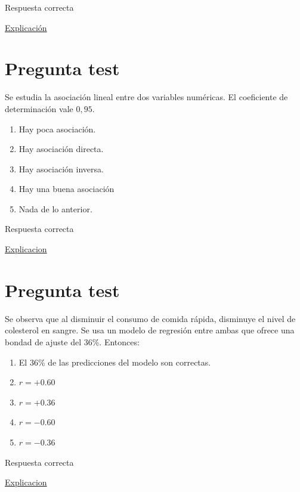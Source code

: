 \documentclass[
]{book}
\providecommand{\tightlist}{%
  \setlength{\itemsep}{0pt}\setlength{\parskip}{0pt}}
\begin{document}
Respuesta correcta

\href{https://1fjmanzano.github.io/bioestadistica/relaci\%C3\%B3n-entre-variables-nume\%CC\%81ricas.html\#coeficiente-de-correlacio\%CC\%81n}{Explicación}

\hypertarget{pregunta-test-119}{%
\section{Pregunta test}\label{pregunta-test-119}}

Se estudia la asociación lineal entre dos variables numéricas. El coeficiente de determinación vale \(0,95\).

\begin{enumerate}
\def\labelenumi{\alph{enumi})}
\tightlist
\item
  Hay poca asociación.
\item
  Hay asociación directa.
\item
  Hay asociación inversa.
\item
  Hay una buena asociación
\item
  Nada de lo anterior.
\end{enumerate}

Respuesta correcta

\href{https://es.wikipedia.org/wiki/Coeficiente_de_determinación}{Explicacion}

\hypertarget{pregunta-test-120}{%
\section{Pregunta test}\label{pregunta-test-120}}

Se observa que al disminuir el consumo de comida rápida, disminuye el nivel de colesterol en sangre. Se usa un modelo de regresión entre ambas que ofrece una bondad de ajuste del 36\%. Entonces:

\begin{enumerate}
\def\labelenumi{\alph{enumi})}
\tightlist
\item
  El 36\% de las predicciones del modelo son correctas.
\item
  \(r= +0.60\)
\item
  \(r= +0.36\)
\item
  \(r= -0.60\)
\item
  \(r= -0.36\)
\end{enumerate}

Respuesta correcta

\href{https://es.wikipedia.org/wiki/Coeficiente_de_determinación}{Explicacion}
\end{document}
